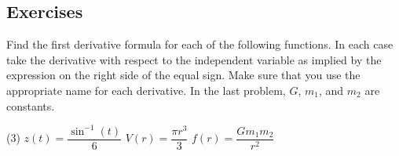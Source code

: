 \documentclass[12pt,]{book}
\theoremstyle{plain}
\theoremstyle{definition}
\numberwithin{equation}{section}
\newcommand{\fe}[2]{#1\mathopen{}\left(#2\right)\mathclose{}}
\begin{document}
\subsection[Exercises]{Exercises}\label{exercises-35}
\hypertarget{exercisegroup-74}{\null}Find the first derivative formula for each of the following functions.  In each case take the derivative with respect to the independent variable as implied by the expression on the right side of the equal sign.  Make sure that you use the appropriate name for each derivative. In the last problem, \(G\), \(m_1\), and \(m_2\) are constants.%
\par
\begin{exercisegroup}(3)
\exercise[1.]\hypertarget{exercise-363}{\null}\(\fe{z}{t}=\dfrac{\fe{\sin^{-1}}{t}}{6}\)%
\exercise[2.]\hypertarget{exercise-364}{\null}\(\fe{V}{r}=\dfrac{\pi r^3}{3}\)%
\exercise[3.]\hypertarget{exercise-365}{\null}\(\fe{f}{r}=\dfrac{Gm_1m_2}{r^2}\)%
\end{exercisegroup}
\par\smallskip\noindent
\typeout{************************************************}
\typeout{************************************************}
\end{document}
